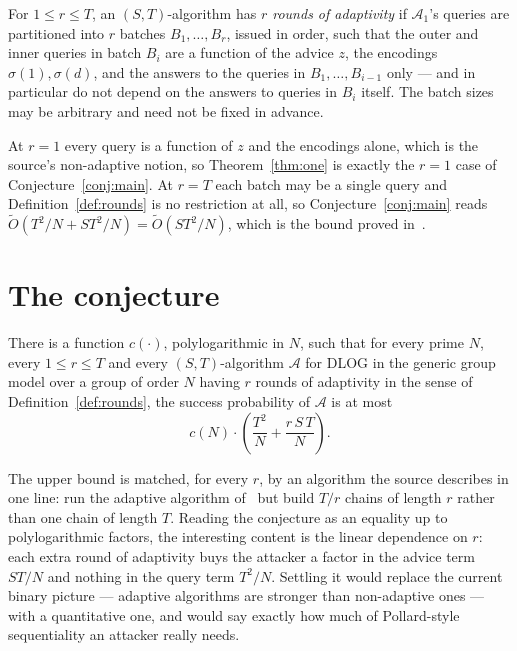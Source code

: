 \documentclass{aicr-conjecture}
\newcommand{\Adv}{\mathcal{A}}
\newcommand{\Ot}{\widetilde{O}}
\begin{document}
\begin{definition}\label{def:rounds}
For $1 \le r \le T$, an $(S,T)$-algorithm has \emph{$r$ rounds of
adaptivity} if $\Adv_{1}$'s queries are partitioned into $r$ batches
$B_{1}, \dots, B_{r}$, issued in order, such that the outer and inner
queries in batch $B_{i}$ are a function of the advice $z$, the
encodings $\sigma(1), \sigma(d)$, and the answers to the queries in
$B_{1}, \dots, B_{i-1}$ only --- and in particular do not depend on the
answers to queries in $B_{i}$ itself. The batch sizes may be arbitrary
and need not be fixed in advance.
\end{definition}

\begin{remark}
At $r = 1$ every query is a function of $z$ and the encodings alone,
which is the source's non-adaptive notion, so
Theorem~\ref{thm:one} is exactly the $r = 1$ case of
Conjecture~\ref{conj:main}. At $r = T$ each batch may be a single
query and Definition~\ref{def:rounds} is no restriction at all, so
Conjecture~\ref{conj:main} reads $\Ot(T^{2}/N + ST^{2}/N) =
\Ot(ST^{2}/N)$, which is the bound proved in~\cite{CK18}.
\end{remark}

\section{The conjecture}\label{sec:conjectures}

\begin{conjecture}\label{conj:main}
There is a function $c(\cdot)$, polylogarithmic in $N$, such that for
every prime $N$, every $1 \le r \le T$ and every $(S,T)$-algorithm
$\Adv$ for DLOG in the generic group model over a group of order $N$
having $r$ rounds of adaptivity in the sense of
Definition~\ref{def:rounds}, the success probability of $\Adv$ is at
most
\[
  c(N) \cdot \left( \frac{T^{2}}{N} + \frac{r \, S \, T}{N} \right).
\]
\end{conjecture}

\begin{remark}
The upper bound is matched, for every $r$, by an algorithm the source
describes in one line: run the adaptive algorithm
of~\cite{BL13,CK18,Mih10} but build $T/r$ chains of length $r$ rather
than one chain of length $T$. Reading the conjecture as an equality up
to polylogarithmic factors, the interesting content is the linear
dependence on $r$: each extra round of adaptivity buys the attacker a
factor in the advice term $ST/N$ and nothing in the query term
$T^{2}/N$. Settling it would replace the current binary picture ---
adaptive algorithms are stronger than non-adaptive ones --- with a
quantitative one, and would say exactly how much of Pollard-style
sequentiality an attacker really needs.
\end{remark}
\end{document}
